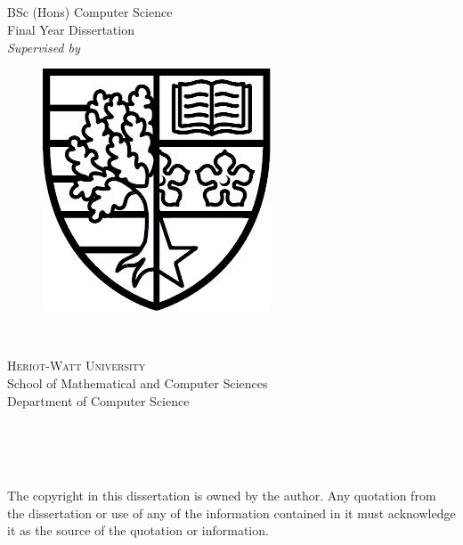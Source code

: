 \begin{titlepage}

\begin{center}
	~\\[1cm]
	{\huge \titleColor \textbf{\docTitle}}\\
	~\\[1.5cm]
	
	{\huge \docAuthor}\\[1cm]
	{\Large BSc (Hons) Computer Science}\\[0.3cm]
	{\Large Final Year Dissertation}\\[1cm]
	{\large \textit{Supervised by} {\Large \docSupervisor}}
	~\\[2cm]
	
	\begin{figure}[h]
		\begin{center}
		\includegraphics[]{1_front_matter/hwcoa_bw.jpg}
		\end{center}
	\end{figure}	
	~\\[0cm]
	\begin{large}
		\textsc{Heriot-Watt University}\\
		School of Mathematical and Computer Sciences\\
		Department of Computer Science
	\end{large}
	~\\[1cm]
	
	{\Large \docDate}\\
	~\\[1.5cm]
	
	\begin{minipage}{0.7\textwidth}
	\singlespacing
	\begin{footnotesize}
	The copyright in this dissertation is owned by the author. Any quotation from the dissertation or use of any of the information contained in it must acknowledge it as the source of the quotation or information.
	\end{footnotesize}
	\end{minipage}
	
\end{center}

\end{titlepage}